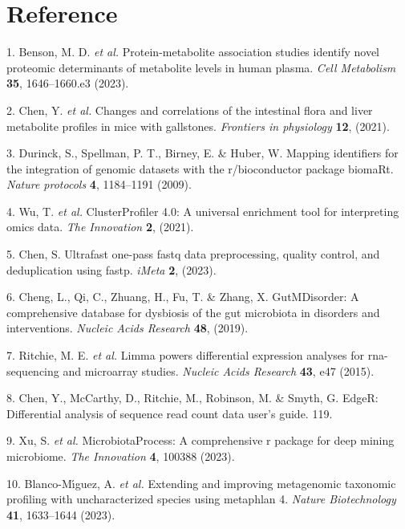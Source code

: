 \documentclass[
]{article}
\newenvironment{cslreferences}%
  {}%
  {\par}
\begin{document}
\hypertarget{bibliography}{%
\section*{Reference}\label{bibliography}}

\hypertarget{refs}{}
\begin{cslreferences}
\leavevmode\hypertarget{ref-ProteinMetabolBenson2023}{}%
1. Benson, M. D. \emph{et al.} Protein-metabolite association studies identify novel proteomic determinants of metabolite levels in human plasma. \emph{Cell Metabolism} \textbf{35}, 1646--1660.e3 (2023).

\leavevmode\hypertarget{ref-ChangesAndCorChen2021}{}%
2. Chen, Y. \emph{et al.} Changes and correlations of the intestinal flora and liver metabolite profiles in mice with gallstones. \emph{Frontiers in physiology} \textbf{12}, (2021).

\leavevmode\hypertarget{ref-MappingIdentifDurinc2009}{}%
3. Durinck, S., Spellman, P. T., Birney, E. \& Huber, W. Mapping identifiers for the integration of genomic datasets with the r/bioconductor package biomaRt. \emph{Nature protocols} \textbf{4}, 1184--1191 (2009).

\leavevmode\hypertarget{ref-ClusterprofilerWuTi2021}{}%
4. Wu, T. \emph{et al.} ClusterProfiler 4.0: A universal enrichment tool for interpreting omics data. \emph{The Innovation} \textbf{2}, (2021).

\leavevmode\hypertarget{ref-UltrafastOnePChen2023}{}%
5. Chen, S. Ultrafast one-pass fastq data preprocessing, quality control, and deduplication using fastp. \emph{iMeta} \textbf{2}, (2023).

\leavevmode\hypertarget{ref-GutmdisorderACheng2019}{}%
6. Cheng, L., Qi, C., Zhuang, H., Fu, T. \& Zhang, X. GutMDisorder: A comprehensive database for dysbiosis of the gut microbiota in disorders and interventions. \emph{Nucleic Acids Research} \textbf{48}, (2019).

\leavevmode\hypertarget{ref-LimmaPowersDiRitchi2015}{}%
7. Ritchie, M. E. \emph{et al.} Limma powers differential expression analyses for rna-sequencing and microarray studies. \emph{Nucleic Acids Research} \textbf{43}, e47 (2015).

\leavevmode\hypertarget{ref-EdgerDifferenChen}{}%
8. Chen, Y., McCarthy, D., Ritchie, M., Robinson, M. \& Smyth, G. EdgeR: Differential analysis of sequence read count data user's guide. 119.

\leavevmode\hypertarget{ref-MicrobiotaproceXuSh2023}{}%
9. Xu, S. \emph{et al.} MicrobiotaProcess: A comprehensive r package for deep mining microbiome. \emph{The Innovation} \textbf{4}, 100388 (2023).

\leavevmode\hypertarget{ref-ExtendingAndIBlanco2023}{}%
10. Blanco-Mı́guez, A. \emph{et al.} Extending and improving metagenomic taxonomic profiling with uncharacterized species using metaphlan 4. \emph{Nature Biotechnology} \textbf{41}, 1633--1644 (2023).
\end{cslreferences}
\end{document}
